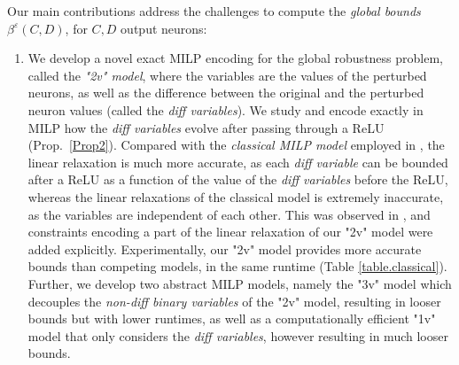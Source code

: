 Our main contributions address the challenges to compute the {\em global bounds} $\beta^\varepsilon(C,D)$, for $C,D$ output neurons:
\begin{enumerate}
	
	\item We develop a novel exact MILP encoding for the global robustness problem,
	called the {\em "2v" model}, where the variables are the values of the perturbed neurons, as well as the difference between the original and the perturbed neuron values (called the {\em diff variables}). We study and encode exactly in MILP how the {\em diff variables} evolve after passing through a ReLU (Prop.~\ref{Prop2}). Compared with the
	{\em classical MILP model} \cite{MILP} employed in \cite{vhagar,lipshitz},
	the linear relaxation is much more accurate, as each {\em diff variable} can be bounded after a ReLU as a function of the value of the {\em diff variables} before the ReLU, whereas the linear relaxations of the classical model is extremely inaccurate, as the variables are independent of each other. This was observed in \cite{lipshitz}, and constraints encoding
	a part of the linear relaxation of our "2v" model were added explicitly. Experimentally, 
	our "2v" model provides more accurate bounds than competing models, in the same runtime
	(Table \ref{table.classical}).
	Further, we develop two abstract MILP models, namely the "3v" model which decouples the 
	{\em non-diff binary variables} of the "2v" model, resulting in looser bounds but with lower runtimes, as well as a computationally efficient "1v" model that only considers the 
	{\em diff variables}, however resulting in much looser bounds.


\end{enumerate}
